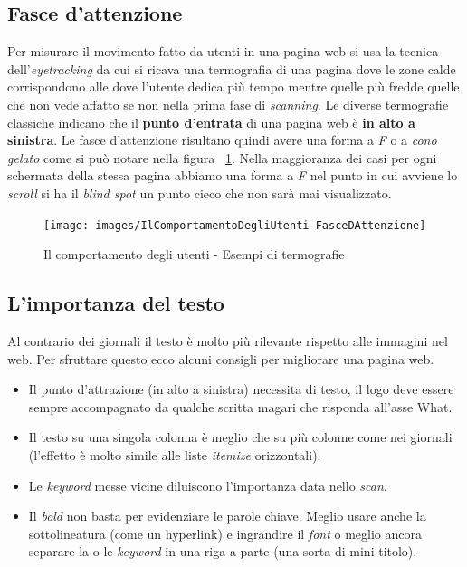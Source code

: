 		\subsection{Fasce d'attenzione}
		
			Per misurare il movimento fatto da utenti in una pagina web si usa la tecnica dell'\emph{eyetracking} da cui si ricava una termografia di una pagina dove le zone calde corrispondono alle dove l'utente dedica più tempo mentre quelle più fredde quelle che non vede affatto se non nella prima fase di \emph{scanning}. Le diverse termografie classiche indicano che il \textbf{punto d'entrata} di una pagina web è \textbf{in alto a sinistra}. Le fasce d'attenzione risultano quindi avere una forma a \emph{F} o a \emph{cono gelato} come si può notare nella figura ~\ref{fig:FasceDAttenzione}.
			Nella maggioranza dei casi per ogni schermata della stessa pagina abbiamo una forma a \emph{F} nel punto in cui avviene lo \emph{scroll} si ha il \emph{blind spot} un punto cieco che non sarà mai visualizzato.
			
			\begin{figure} [h]
				\centering
				\texttt{[image: images/IlComportamentoDegliUtenti-FasceDAttenzione]}
				\caption[Il comportamento degli utenti - Termografie]{Il comportamento degli utenti - Esempi di termografie}
				\label{fig:FasceDAttenzione}
			\end{figure}
		
		\subsection{L'importanza del testo}
			Al contrario dei giornali il testo è molto più rilevante rispetto alle immagini nel web. Per sfruttare questo ecco alcuni consigli per migliorare una pagina web.
			\begin{itemize}
				\item Il punto d'attrazione (in alto a sinistra) necessita di testo, il logo deve essere sempre accompagnato da qualche scritta magari che risponda all'asse What.
				\item Il testo su una singola colonna è meglio che su più colonne come nei giornali (l'effetto è molto simile alle liste \emph{itemize} orizzontali).
				\item Le \emph{keyword} messe vicine diluiscono l'importanza data nello \emph{scan}.
				\item Il \emph{bold} non basta per evidenziare le parole chiave. Meglio usare anche la sottolineatura (come un hyperlink) e ingrandire il \emph{font} o meglio ancora separare la o le \emph{keyword} in una riga a parte (una sorta di mini titolo).
			\end{itemize}
		
